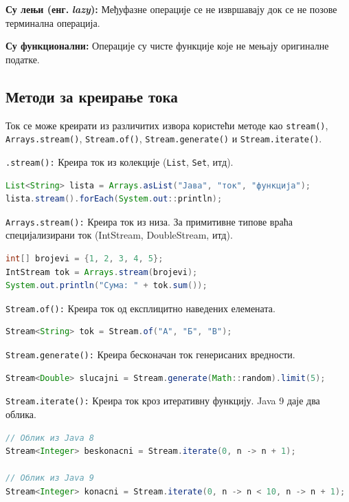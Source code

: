\textbf{Су лењи (енг. }\textbf{\textit{lazy}}\textbf{):} Међуфазне операције се не извршавају док се не позове терминална операција.

\textbf{Су функционални:} Операције су чисте функције које не мењају оригиналне податке.


\subsection{Методи за креирање тока}

Ток се може креирати из различитих извора користећи методе као \texttt{stream()}, \texttt{Arrays.stream()}, \texttt{Stream.of()}, \texttt{Stream.generate()} и \texttt{Stream.iterate()}.

\texttt{.stream():} Креира ток из колекције (\texttt{List}, \texttt{Set}, итд).

\begin{lstlisting}[language=Java]
List<String> lista = Arrays.asList("Јава", "ток", "функција");
lista.stream().forEach(System.out::println);
\end{lstlisting}


\texttt{Arrays.stream():} Креира ток из низа. За примитивне типове враћа специјализирани ток (IntStream, DoubleStream, итд).

\begin{lstlisting}[language=Java]
int[] brojevi = {1, 2, 3, 4, 5};
IntStream tok = Arrays.stream(brojevi);
System.out.println("Сума: " + tok.sum());
\end{lstlisting}


\texttt{Stream.of():} Креира ток од експлицитно наведених елемената.

\begin{lstlisting}[language=Java]
Stream<String> tok = Stream.of("А", "Б", "В");
\end{lstlisting}


\texttt{Stream.generate():} Креира бесконачан ток генерисаних вредности.

\begin{lstlisting}[language=Java]
Stream<Double> slucajni = Stream.generate(Math::random).limit(5);
\end{lstlisting}


\texttt{Stream.iterate():} Креира ток кроз итеративну функцију. Java 9 даје два облика.

\begin{lstlisting}[language=Java]
// Облик из Java 8
Stream<Integer> beskonacni = Stream.iterate(0, n -> n + 1);
 
// Облик из Java 9
Stream<Integer> konacni = Stream.iterate(0, n -> n < 10, n -> n + 1);
\end{lstlisting}


